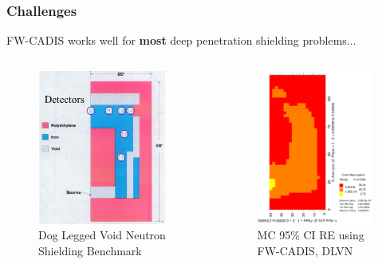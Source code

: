 \documentclass[xcolor=x11names,compress]{beamer}
\renewcommand{\(}{\begin{columns}}
\renewcommand{\)}{\end{columns}}
\newcommand{\<}[1]{\begin{column}{#1}}
\renewcommand{\>}{\end{column}}
\begin{document}
\begin{frame}[fragile]
  \frametitle{Challenges}

	FW-CADIS works well for \textbf{most} deep penetration
	shielding problems...
	\begin{columns}
  	\begin{column}{0.5\textwidth}
  	\begin{figure}
  	\begin{center}
  		\includegraphics[height=2in,clip]{dlvn}
		\caption{Dog Legged Void Neutron Shielding Benchmark}
	\end{center}
  	\end{figure}
  	\end{column}
 	\begin{column}{0.5\textwidth}
 	\begin{figure}
  	\begin{center}
  		\includegraphics[height=2in,clip]{dlvn-lowVR}
  		\caption{MC 95\% CI RE using FW-CADIS, DLVN}
  	\end{center}
  	\end{figure}
  	\end{column}
	\end{columns}
  
\end{frame}
\end{document}
